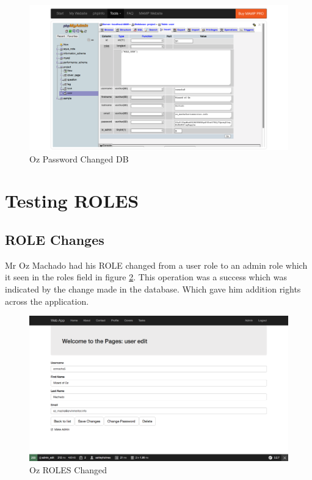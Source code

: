 \begin{figure}[htbp]
   \centering
   \includegraphics[width=400pt]{figures/oz_change_password_db.png} %
   \caption{Oz Password Changed DB}
   \label{fig:Oz Password Changed DB}
\end{figure}


\section{Testing ROLES}

\subsection{ROLE Changes}

Mr Oz Machado had his ROLE changed from a user role to an admin role which it seen in the roles field in figure \ref{fig:Oz ROLES Changed}. This operation was a success which was indicated by the change made in the database. Which gave him addition rights across the application.

\begin{figure}[htbp]
   \centering
   \includegraphics[width=400pt]{figures/oz_making_admin.png} %
   \caption{Oz ROLES Changed}
   \label{fig:Oz ROLES Changed}
\end{figure}

